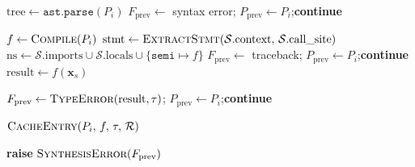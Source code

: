 \begin{algorithm}[t]
\begin{algorithmic}[1]
  \Statex \hspace{\algorithmicindent}
  \State $\mathrm{tree} \gets \texttt{ast.parse}(P_i)$
    \State $F_{\mathrm{prev}} \gets$ syntax error;\enspace
           $P_{\mathrm{prev}} \gets P_i$;\enspace \textbf{continue}
  \EndIf

  \Statex \hspace{\algorithmicindent}
  \State $f \gets \textsc{Compile}(P_i)$
    \State $\mathrm{stmt} \gets \textsc{ExtractStmt}(\mathcal{S}.\mathrm{context},\, \mathcal{S}.\mathrm{call\_site})$
    \State $\mathrm{ns} \gets \mathcal{S}.\mathrm{imports} \cup \mathcal{S}.\mathrm{locals} \cup \{\texttt{semi} \mapsto f\}$
      \State $F_{\mathrm{prev}} \gets$ traceback;\enspace
             $P_{\mathrm{prev}} \gets P_i$;\enspace \textbf{continue}
    \EndIf
    \State $\mathrm{result} \gets f(\mathbf{x}_s)$
  \EndIf

  \Statex \hspace{\algorithmicindent}
      \State $F_{\mathrm{prev}} \gets \textsc{TypeError}(\mathrm{result}, \tau)$;\enspace
             $P_{\mathrm{prev}} \gets P_i$;\enspace \textbf{continue}
    \EndIf
  \EndIf

  \Statex \hspace{\algorithmicindent}
  \State \Return $\textsc{CacheEntry}(P_i,\, f,\, \tau,\, \mathcal{R})$
\EndFor

\State \textbf{raise} $\textsc{SynthesisError}(F_{\mathrm{prev}})$
\end{algorithmic}
\end{algorithm}



